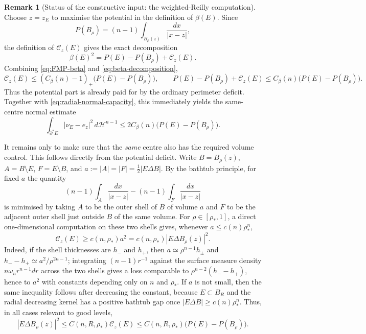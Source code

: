 \documentclass[11pt]{amsart}
\theoremstyle{definition}
\newtheorem{remark}[theorem]{Remark}
\newcommand{\rstar}{\rho_*}
\newcommand{\Hn}{\mathcal H^{n-1}}
\begin{document}
\begin{remark}[Status of the constructive input: the weighted-Reilly computation]
Choose \(z=z_E\) to maximise the potential in the definition of \(\beta(E)\).
Since
\[
   P(B_\rho)=(n-1)\int_{B_\rho(z)}\frac{dx}{|x-z|},
\]
the definition of \(\mathcal C_z(E)\) gives the exact decomposition
\begin{equation}\label{eq:beta-decomposition}
   \beta(E)^2
   =P(E)-P(B_\rho)+\mathcal C_z(E).
\end{equation}
Combining \eqref{eq:FMP-beta} and \eqref{eq:beta-decomposition},
\begin{equation}\label{eq:potential-by-perimeter}
   \mathcal C_z(E)
   \le (C_\beta(n)-1)_+\bigl(P(E)-P(B_\rho)\bigr),
   \qquad
   P(E)-P(B_\rho)+\mathcal C_z(E)
   \le C_\beta(n)\bigl(P(E)-P(B_\rho)\bigr).
\end{equation}
Thus the potential part is already paid for by the ordinary perimeter deficit.
Together with \eqref{eq:radial-normal-capacity}, this immediately yields the
same-centre normal estimate
\begin{equation}\label{eq:FMP-normal-from-beta}
   \int_{\partial^*E}|\nu_E-e_z|^2\,d\Hn
   \le 2C_\beta(n)\bigl(P(E)-P(B_\rho)\bigr).
\end{equation}

It remains only to make sure that the \emph{same} centre also has the required
volume control.  This follows directly from the potential deficit.  Write
\(B=B_\rho(z)\), \(A=B\setminus E\), \(F=E\setminus B\), and
\(a:=|A|=|F|=\tfrac12|E\Delta B|\).  By the bathtub principle, for fixed \(a\)
the quantity
\[
   (n-1)\int_A\frac{dx}{|x-z|}-(n-1)\int_F\frac{dx}{|x-z|}
\]
is minimised by taking \(A\) to be the outer shell of \(B\) of volume \(a\) and
\(F\) to be the adjacent outer shell just outside \(B\) of the same volume.  For
\(\rho\in[\rstar,1]\), a direct one-dimensional computation on these two shells
gives, whenever \(a\le c(n)\rstar^n\),
\begin{equation}\label{eq:potential-controls-centered-volume}
   \mathcal C_z(E)\ge c(n,\rstar)a^2
   =c(n,\rstar)|E\Delta B_\rho(z)|^2 .
\end{equation}
Indeed, if the shell thicknesses are \(h_-\) and \(h_+\), then
\(a\simeq \rho^{n-1}h_\pm\) and
\(h_- -h_+\simeq a^2/\rho^{2n-1}\); integrating
\((n-1)r^{-1}\) against the surface measure density \(n\omega_n r^{n-1}dr\)
across the two shells gives a loss comparable to
\(\rho^{n-2}(h_- -h_+)\), hence to \(a^2\) with constants depending only on
\(n\) and \(\rstar\).  If \(a\) is not small, then the same inequality follows
after decreasing the constant, because \(E\subset B_R\) and the radial decreasing
kernel has a positive bathtub gap once \(|E\Delta B|\ge c(n)\rstar^n\).  Thus, in
all cases relevant to good levels,
\begin{equation}\label{eq:FMP-same-centre-volume}
   |E\Delta B_\rho(z)|^2
   \le C(n,R,\rstar)\mathcal C_z(E)
   \le C(n,R,\rstar)\bigl(P(E)-P(B_\rho)\bigr).
\end{equation}


\end{remark}
\end{document}
